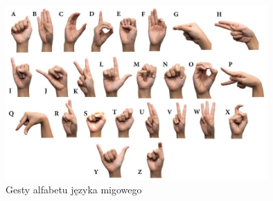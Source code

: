 \begin{figure}[H]
    \begin{center}
        \includegraphics[width=10cm]{../images/american_sign_language.jpg}
        \caption{Gesty alfabetu języka migowego \cite{bib:sign_languge_img}}
        \label{img:alphabet}
    \end{center}
\end{figure}

